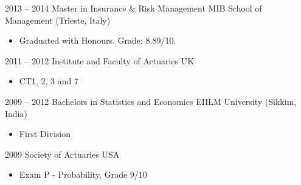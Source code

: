 \documentclass[a4paper,]{fortysecondscv}
\begin{document}



\begin{cvtable}[2]
    \cvitem
    {2013 -- 2014}
    {Master in Insurance \& Risk Management}
    {MIB School of Management (Trieste, Italy)}
    {
        \begin{itemize}[nosep, leftmargin=0pt, label={}] %
            \item Graduated with Honours. Grade: 8.89/10.
        \end{itemize}
    }
    \cvitem
    {2011 -- 2012}
    {Institute and Faculty of Actuaries}
    {UK}
    {
        \vspace{-\topsep}
        \begin{itemize}[nosep, leftmargin=0pt, label={}]
            \item CT1, 2, 3 and 7
        \end{itemize}
    }

    \cvitem
    {2009 -- 2012}
    {Bachelors in Statistics and Economics}
    {EIILM University (Sikkim, India)}
    {
        \vspace{-\topsep}
        \begin{itemize}[nosep, leftmargin=0pt, label={}]
            \item First Division
        \end{itemize}
    }
    \cvitem
    {2009}
    {Society of Actuaries}
    {USA}
    {
        \vspace{-\topsep}
        \begin{itemize}[nosep, leftmargin=0pt, label={}]
            \item Exam P - Probability, Grade 9/10
        \end{itemize}
    }
\end{cvtable}
\end{document}
